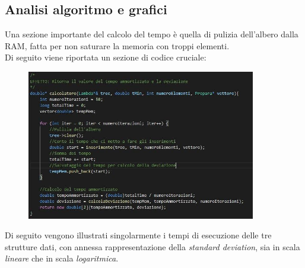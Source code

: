 \documentclass[a4paper]{article}
\begin{document}
		\subsection{Analisi algoritmo e grafici}
		Una sezione importante del calcolo del tempo è quella di pulizia dell'albero dalla RAM, fatta per non saturare la memoria con troppi elementi.\\
		Di seguito viene riportata un sezione di codice cruciale: 
		\begin{figure}[ht]
			\includegraphics[width=10cm]{Descrizione}
		\end{figure}
		\newpage
		Di seguito vengono illustrati singolarmente i tempi di esecuzione delle tre strutture dati, con annessa rappresentazione della \textit{standard deviation}, sia in scala \textit{lineare} che in scala \textit{logaritmica}.\\
\end{document}
